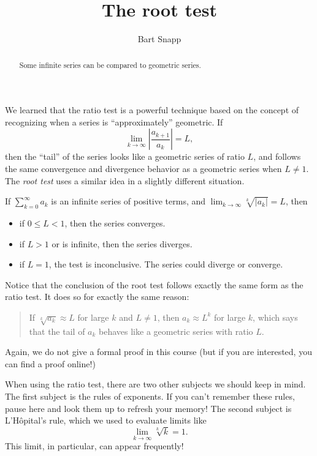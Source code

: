 \documentclass{ximera}
\author{Bart Snapp}
\title[Dig-In:]{The root test}
\begin{document}
\begin{abstract}
Some infinite series can be compared to geometric series.
\end{abstract}
\maketitle

We learned that the ratio test is a powerful technique based on the
concept of recognizing when a series is ``approximately'' geometric.
If
\[
\lim_{k \to \infty} \left|\frac{a_{k+1}}{a_k}\right| = L,
\]
then the ``tail'' of the series looks like a geometric series of ratio
$L$, and follows the same convergence and divergence behavior as a
geometric series when $L\neq 1$.  The \textit{root test} uses a similar idea in a
slightly different situation.
\begin{theorem}
  If $\sum_{k=0}^\infty a_k$ is an infinite series of positive terms, and $\lim_{k \to \infty} \sqrt[k]{|a_k|} = L$, then 
  \begin{itemize}
  \item if $0 \leq L < 1$, then the series converges.
  \item if $L>1$ or is infinite, then the series diverges.
  \item if $L = 1$, the test is inconclusive. The series could diverge or converge.
  \end{itemize}
\end{theorem}
Notice that the conclusion of the root test follows exactly the same
form as the ratio test.  It does so for exactly the same reason:
\begin{quote}
  If $\sqrt[k]{a_k} \approx L$ for large $k$ and $L \neq 1$, then $a_k \approx L^k$
  for large $k$, which says that the tail of $a_k$ behaves like
  a geometric series with ratio $L$.
\end{quote}
Again, we do not give a formal proof in this course (but if you are
interested, you can find a proof online!)

When using the ratio test, there are two other subjects we should keep in mind. 
The first subject is the rules of exponents.  If you can't remember these rules, 
pause here and look them up to refresh your memory!  The second subject is 
L'H\^{o}pital's rule, which we used to evaluate limits like
\[
\lim_{k \to \infty} \sqrt[k]{k} = 1.
\]
This limit, in particular, can appear frequently!
\end{document}
